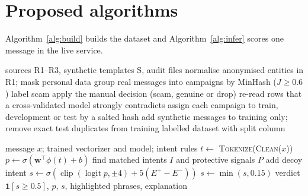\documentclass[12pt,a4paper]{report}
\begin{document}
\section{Proposed algorithms}
Algorithm~\ref{alg:build} builds the dataset and Algorithm~\ref{alg:infer} scores one message in the live service.

\begin{algorithm}[H]
\caption{Building and splitting ScamGuard-IN-2026}
\label{alg:build}
\begin{algorithmic}[1]
\Require sources R1--R3, synthetic templates S, audit files
\State normalise anonymised entities in R1; mask personal data
\State group real messages into campaigns by MinHash ($J\ge0.6$)
   \State label scam \Else \State apply the manual decision (scam, genuine or drop) \EndIf
\EndFor
\State re-read rows that a cross-validated model strongly contradicts
\State assign each campaign to train, development or test by a salted hash
\State add synthetic messages to training only; remove exact test duplicates from training
\State \Return labelled dataset with split column
\end{algorithmic}
\end{algorithm}

\begin{algorithm}[H]
\caption{Scoring one message in the live service}
\label{alg:infer}
\begin{algorithmic}[1]
\Require message $x$; trained vectorizer and model; intent rules
\State $t\gets$ \textsc{Tokenize}(\textsc{Clean}($x$))
\State $p\gets\sigma(\mathbf{w}^\top\phi(t)+b)$
\State find matched intents $I$ and protective signals $P$
 \State add decoy intent \EndIf
\State $s\gets\sigma(\operatorname{clip}(\operatorname{logit}p,\pm4)+5(E^+-E^-))$
 \State $s\gets\min(s,0.15)$ \EndIf
\State \Return verdict $\mathbf{1}[s\ge0.5]$, $p$, $s$, highlighted phrases, explanation
\end{algorithmic}
\end{algorithm}
\end{document}
